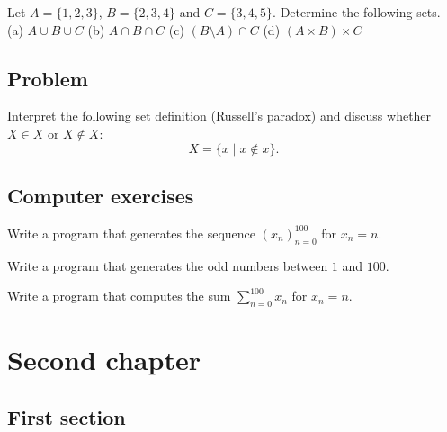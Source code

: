 \documentclass{tstextbook}
\begin{document}
\begin{exercise}
  Let $A = \{1, 2, 3\}$, $B = \{2, 3, 4\}$ and $C = \{3, 4, 5\}$.
  Determine the following sets. \\
  (a) $A \cup B \cup C$ \quad
  (b) $A \cap B \cap C$ \quad
  (c) $(B \setminus A) \cap C$ \quad
  (d) $(A \times B) \times C$
\end{exercise}

\section*{Problem}

\begin{problem}
  Interpret the following set definition (Russell's paradox) and discuss
  whether $X \in X$ or $X \notin X$:
  \begin{equation}
    X = \{x \mid x \notin x\}.
  \end{equation}
\end{problem}

\section*{Computer exercises}

\begin{programming}
  Write a program that generates the sequence $(x_n)_{n=0}^{100}$
  for $x_n = n$.
\end{programming}

\begin{programming}
  Write a program that generates the odd numbers between $1$ and $100$.
\end{programming}

\begin{programming}
  Write a program that computes the sum $\sum_{n=0}^{100} x_n$
  for $x_n = n$.
\end{programming}

\chapter{Second chapter}

\begin{summary}
  \blindtext
\end{summary}

\section{First section}
\Blindtext
\end{document}
